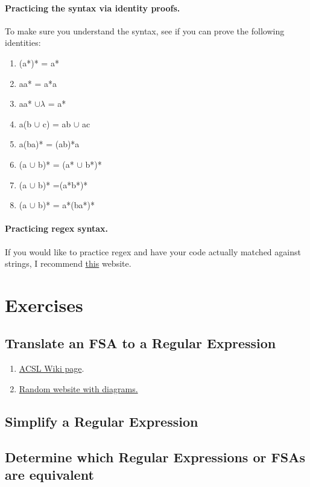 \documentclass[10pt]{article}
\begin{document}
\paragraph{Practicing the syntax via identity proofs.}
To make sure you understand the syntax, see if you can prove the following identities:
\begin{enumerate}
\item (a*)* = a*
\item aa* = a*a
\item aa* $\cup \lambda$ = a*
\item a(b $\cup$ c) = ab $\cup$ ac
\item a(ba)* = (ab)*a
\item (a $\cup$ b)* = (a* $\cup$ b*)*
\item (a $\cup$ b)* =(a*b*)*
\item (a $\cup$ b)* = a*(ba*)*
\end{enumerate}

\paragraph{Practicing regex syntax.}
If you would like to practice regex and have your code actually
matched against strings, I recommend \href{https://regexr.com/}{this} website.

\section{Exercises}
\subsection{Translate an FSA to a Regular Expression}
\label{par:translate}
\begin{enumerate}
\item \href{http://www.categories.acsl.org/wiki/index.php?title=FSAs_and_Regular_Expressions}{ACSL Wiki page}.
\item \href{http://www.apcomputerscience.com/cst/topic_descriptions/regularExpressionsAndFSA.pdf}{Random website with diagrams.}
\end{enumerate}

\subsection{Simplify a Regular Expression}
\label{par:simplify}

\subsection{Determine which Regular Expressions or FSAs are equivalent}
\label{par:equivalent}
\end{document}
